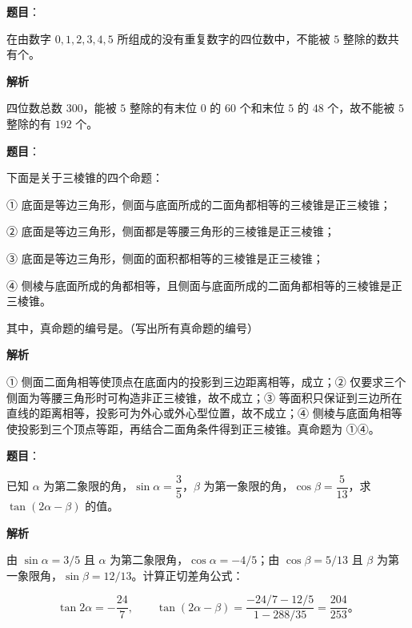 \begin{answer}

\textbf{题目}：

在由数字 $0,1,2,3,4,5$ 所组成的没有重复数字的四位数中，不能被 $5$ 整除的数共有\gkblank{}个。

\textbf{解析}

四位数总数 $300$，能被 $5$ 整除的有末位 $0$ 的 $60$ 个和末位 $5$ 的 $48$ 个，故不能被 $5$ 整除的有 $192$ 个。


\end{answer}
\begin{answer}

\textbf{题目}：

下面是关于三棱锥的四个命题：

① 底面是等边三角形，侧面与底面所成的二面角都相等的三棱锥是正三棱锥；

② 底面是等边三角形，侧面都是等腰三角形的三棱锥是正三棱锥；

③ 底面是等边三角形，侧面的面积都相等的三棱锥是正三棱锥；

④ 侧棱与底面所成的角都相等，且侧面与底面所成的二面角都相等的三棱锥是正三棱锥。

其中，真命题的编号是\gkblank{}。（写出所有真命题的编号）

\textbf{解析}

① 侧面二面角相等使顶点在底面内的投影到三边距离相等，成立；② 仅要求三个侧面为等腰三角形时可构造非正三棱锥，故不成立；③ 等面积只保证到三边所在直线的距离相等，投影可为外心或外心型位置，故不成立；④ 侧棱与底面角相等使投影到三个顶点等距，再结合二面角条件得到正三棱锥。真命题为 ①④。


\end{answer}
\begin{answer}

\textbf{题目}：

已知 $\alpha$ 为第二象限的角，$\sin\alpha=\dfrac35$，$\beta$ 为第一象限的角，$\cos\beta=\dfrac5{13}$，求 $\tan(2\alpha-\beta)$ 的值。

\textbf{解析}

由 $\sin\alpha=3/5$ 且 $\alpha$ 为第二象限角，$\cos\alpha=-4/5$；由 $\cos\beta=5/13$ 且 $\beta$ 为第一象限角，$\sin\beta=12/13$。计算正切差角公式：

\nopagebreak[4]
\[
\tan2\alpha=-\frac{24}{7},
\qquad
\tan(2\alpha-\beta)
=\frac{-24/7-12/5}{1-288/35}
=\frac{204}{253}\text{。}
\]


\end{answer}
